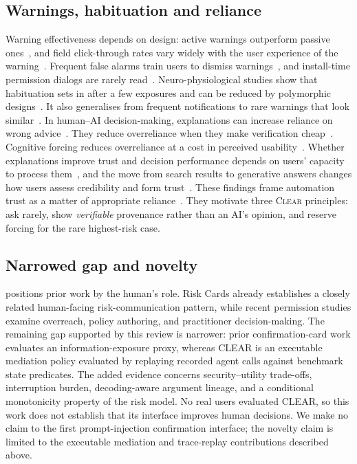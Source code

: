 \documentclass[preprint,12pt,nonatbib]{elsarticle}
\theoremstyle{remark}
\newcommand{\clear}{\textsc{Clear}}
\begin{document}
\subsection{Warnings, habituation and reliance}
Warning effectiveness depends on design: active warnings outperform passive
ones~\citep{egelman2008warned}, and field click-through rates vary widely with
the user experience of the warning~\citep{akhawe2013alice}. Frequent false
alarms train users to dismiss warnings~\citep{sunshine2009crying}, and
install-time permission dialogs are rarely read~\citep{felt2012android}.
Neuro-physiological studies show that habituation sets in after a few
exposures and can be reduced by polymorphic designs~\citep{anderson2015polymorphic,vance2018tuning}.
It also generalises from frequent notifications to rare warnings that look
similar~\citep{vance2025fog}. In human--AI decision-making, explanations can
increase reliance on wrong advice~\citep{bansal2021whole}. They reduce
overreliance when they make verification cheap~\citep{vasconcelos2023explanations}.
Cognitive forcing reduces overreliance at a cost in perceived
usability~\citep{bucinca2021trust}. Whether explanations improve trust and
decision performance depends on users' capacity to process
them~\citep{wang2024rationality}, and the move from search results to generative
answers changes how users assess credibility and form trust~\citep{casermeiro2027credibility}. These findings frame automation trust as a
matter of appropriate reliance~\citep{parasuraman1997humans,lee2004trust,amershi2019guidelines}.
They motivate three \clear{} principles: ask rarely, show \emph{verifiable}
provenance rather than an AI's opinion, and reserve forcing for the rare
highest-risk case.

\subsection{Narrowed gap and novelty}
 positions prior work by the human's role. Risk Cards
already establishes a closely related human-facing risk-communication
pattern, while recent permission studies examine overreach, policy authoring,
and practitioner decision-making. The remaining gap supported by this review
is narrower: prior confirmation-card work evaluates an information-exposure
proxy, whereas CLEAR is an executable mediation policy evaluated by replaying
recorded agent calls against benchmark state predicates. The added evidence
concerns security--utility trade-offs, interruption burden, decoding-aware
argument lineage, and a conditional monotonicity property of the risk model.
No real users evaluated CLEAR, so this work does not establish that its
interface improves human decisions. We make no claim to the first
prompt-injection confirmation interface; the novelty claim is limited to the
executable mediation and trace-replay contributions described above.
\end{document}
